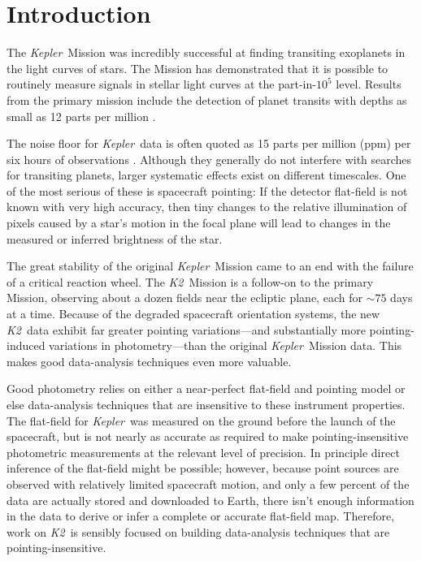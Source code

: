 \documentclass[12pt,preprint]{aastex}
\newcommand{\project}[1]{\textsl{#1}} %
\newcommand{\kepler}{\project{Kepler}}
\newcommand{\KT}{\project{K2}}
\begin{document}

\section{Introduction}

The \kepler\ Mission was incredibly successful at finding transiting
exoplanets in the light curves of stars.
The Mission has demonstrated that it is possible to routinely measure signals
in stellar light curves at the part-in-$10^5$ level.
Results from the primary mission include the detection of planet transits with
depths as small as 12 parts per million \citep{Barclay:2013}.

The noise floor for \kepler\ data is often quoted as 15 parts per million (ppm) per
six hours of observations \citep{Gilliland:2011}.
Although they generally do not interfere with searches for transiting
planets, larger systematic effects exist on different timescales.
One of the most serious of these is spacecraft pointing: If the detector
flat-field is not known with very high accuracy, then tiny changes to the relative
illumination of pixels caused by a star's motion in the focal plane will lead
to changes in the measured or inferred brightness of the star.

The great stability of the original \kepler\ Mission
came to an end with the failure of a critical reaction wheel.
The \KT\ Mission \citep{Howell:2014} is a follow-on to the primary Mission,
observing about a dozen fields near the ecliptic plane, each for
$\sim 75$ days at a time.
Because of the degraded spacecraft orientation systems, the new \KT\ data
exhibit far greater pointing variations---and substantially more
pointing-induced variations in photometry---than the original \kepler\ Mission data.
This makes good data-analysis techniques even more valuable.

Good photometry relies on either a near-perfect flat-field
and pointing model or else data-analysis techniques that are
insensitive to these instrument properties.
The flat-field for \kepler\ was measured on the ground before the launch of
the spacecraft, but is not nearly as accurate as required to make
pointing-insensitive photometric measurements at the relevant level of precision.
In principle direct inference of the flat-field might be possible;
however, because point sources are observed with relatively limited
spacecraft motion, and only a few percent of the data are actually stored and
downloaded to Earth, there isn't enough information in the data to derive or
infer a complete or accurate flat-field map.
Therefore, work on \KT\ is sensibly focused on building data-analysis
techniques that are pointing-insensitive.
\end{document}
